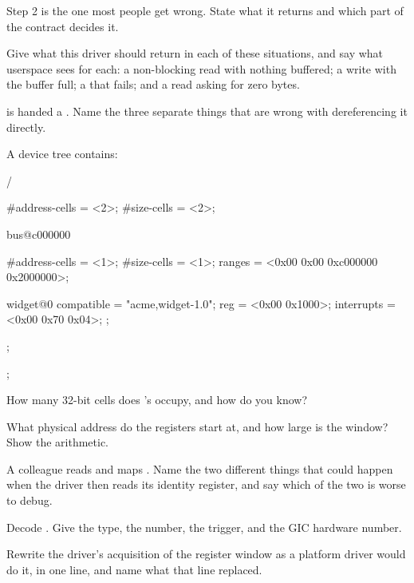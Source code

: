  Step 2 is the one most people get wrong. State what it returns and which part of the
contract decides it. 

 Give what this driver should return in each of these situations, and say what userspace
sees for each: a non-blocking read with nothing buffered; a write with the buffer full; a
 that fails; and a read asking for zero bytes. 

  is handed a . Name the three separate things that are
wrong with dereferencing it directly. 

\label{exa:q:6}

A device tree contains:

\begin{console}
/ {
        #address-cells = <2>;
        #size-cells = <2>;

        bus@c000000 {
                #address-cells = <1>;
                #size-cells = <1>;
                ranges = <0x00 0x00 0xc000000 0x2000000>;

                widget@0 {
                        compatible = "acme,widget-1.0";
                        reg = <0x00 0x1000>;
                        interrupts = <0x00 0x70 0x04>;
                };
        };
};
\end{console}

 How many 32-bit cells does 's  occupy, and how do you know? 

 What physical address do the registers start at, and how large is the window? Show the
arithmetic. 

 A colleague reads  and maps . Name the two different things that could
happen when the driver then reads its identity register, and say which of the two is worse to debug. 

 Decode . Give the type, the number, the trigger, and
the GIC hardware number. 

 Rewrite the driver's acquisition of the register window as a platform driver would do it,
in one line, and name what that line replaced. 

\label{exa:q:7}

